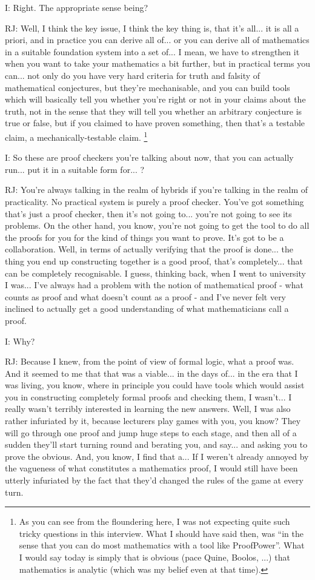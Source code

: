 \documentclass[10pt,titlepage]{book}
\begin{document}
I: Right. The appropriate sense being?

RJ: Well, I think the key issue, I think the key thing is, that it's all... it is all a priori, and in practice you can derive all of... or you can derive all of mathematics in a suitable foundation system into a set of... I mean, we have to strengthen it when you want to take your mathematics a bit further, but in practical terms you can... not only do you have very hard criteria for truth and falsity of mathematical conjectures, but they're mechanisable, and you can build tools which will basically tell you whether you're right or not in your claims about the truth, not in the sense that they will tell you whether an arbitrary conjecture is true or false, but if you claimed to have proven something, then that's a testable claim, a mechanically-testable claim.%
\footnote{As you can see from the floundering here, I was not expecting quite such tricky questions in this interview.
What I should have said then, was ``in the sense that you can do most mathematics with a tool like ProofPower''.
What I would say today is simply that is obvious (pace Quine, Boolos, ...) that mathematics is analytic (which was my belief even at that time). 
}

I: So these are proof checkers you're talking about now, that you can actually run... put it in a suitable form for... ?

RJ: You're always talking in the realm of hybrids if you're talking in the realm of practicality.
No practical system is purely a proof checker.
You've got something that's just a proof checker, then it's not going to... you're not going to see its problems.
On the other hand, you know, you're not going to get the tool to do all the proofs for you for the kind of things you want to prove.
It's got to be a collaboration.
Well, in terms of actually verifying that the proof is done... the thing you end up constructing together is a good proof, that's completely... that can be completely recognisable.
I guess, thinking back, when I went to university I was... I've always had a problem with the notion of mathematical proof - what counts as proof and what doesn't count as a proof - and I've never felt very inclined to actually get a good understanding of what mathematicians call a proof.

I: Why?

RJ: Because I knew, from the point of view of formal logic, what a proof was.
And it seemed to me that that was a viable... in the days of... in the era that I was living, you know, where in principle you could have tools which would assist you in constructing completely formal proofs and checking them, I wasn't... I really wasn't terribly interested in learning the new answers.
Well, I was also rather infuriated by it, because lecturers play games with you, you know? They will go through one proof and jump huge steps to each stage, and then all of a sudden they'll start turning round and berating you, and say... and asking you to prove the obvious. And, you know, I find that a... If I weren't already annoyed by the vagueness of what constitutes a mathematics proof, I would still have been utterly infuriated by the fact that they'd changed the rules of the game at every turn.
\end{document}
